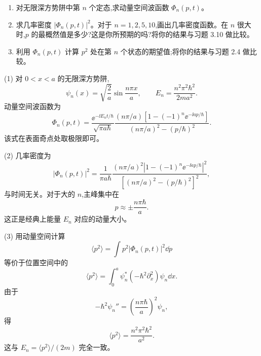 \begin{question}
\begin{enumerate}
\item 对无限深方势阱中第 $n$ 个定态,求动量空间波函数 $\Phi_n(p,t)$。
\item 求几率密度 $|\Phi_n(p,t)|^2$。对于 $n=1,2,5,10$,画出几率密度函数。在 $n$ 很大时,$p$ 的最概然值是多少?这是你所预期的吗?将你的结果与习题 3.10 做比较。
\item 利用 $\Phi_n(p,t)$ 计算 $p^2$ 处在第 $n$ 个状态的期望值;将你的结果与习题 2.4 做比较。
\end{enumerate}
\end{question}
\begin{solution}
(1) 对 $0<x<a$ 的无限深方势阱,
\[
\psi_n(x)=\sqrt{\frac2a}\sin\frac{n\pi x}{a},
\qquad E_n=\frac{n^2\pi^2\hbar^2}{2ma^2}.
\]
动量空间波函数为
\[
\Phi_n(p,t)=\frac{\ee^{-\ii E_nt/\hbar}}{\sqrt{\pi a\hbar}}
\frac{(n\pi/a)\left[1-(-1)^n\ee^{-\ii ap/\hbar}\right]}
{(n\pi/a)^2-(p/\hbar)^2}.
\]
该式在表面奇点处取极限即可。

(2) 几率密度为
\[
|\Phi_n(p,t)|^2=\frac1{\pi a\hbar}
\frac{(n\pi/a)^2\left|1-(-1)^n\ee^{-\ii ap/\hbar}\right|^2}
{\left[(n\pi/a)^2-(p/\hbar)^2\right]^2},
\]
与时间无关。对于大的 $n$,主峰集中在
\[
\boxed{p\approx \pm\frac{n\pi\hbar}{a}.}
\]
这正是经典上能量 $E_n$ 对应的动量大小。

(3) 用动量空间计算
\[
\langle p^2\rangle=\int p^2|\Phi_n(p,t)|^2\dd p
\]
等价于位置空间中的
\[
\langle p^2\rangle=\int_0^a\psi_n^*(-\hbar^2\partial_x^2)\psi_n\dd x.
\]
由于
\[
-\hbar^2\psi_n''=\left(\frac{n\pi\hbar}{a}\right)^2\psi_n,
\]
得
\[
\boxed{\langle p^2\rangle=\frac{n^2\pi^2\hbar^2}{a^2}.}
\]
这与 $E_n=\langle p^2\rangle/(2m)$ 完全一致。
\end{solution}

